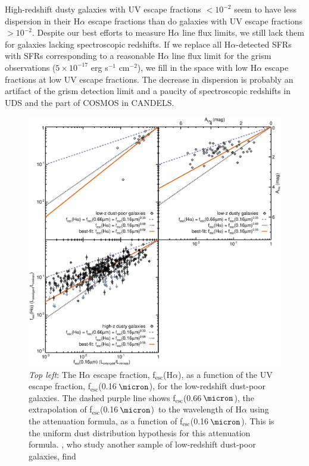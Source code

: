 \documentclass[preprint]{aastex}
\newcommand{\alephuv}{f$_{\mathrm{esc}}$(0.16$\,\micron$)}
\newcommand{\alephha}{f$_{\mathrm{esc}}$(H$\alpha$)}
\newcommand{\alephuvha}{f$_{\mathrm{esc}}$(0.66$\,\micron$)}
\begin{document}
High-redshift dusty galaxies with UV escape fractions $< 10^{-2}$ seem to have
less dispersion in their H$\alpha$ escape fractions than do galaxies with UV
escape fractions $> 10^{-2}$.  Despite our best efforts to measure H$\alpha$
line flux limits, we still lack them for galaxies lacking spectroscopic
redshifts.  If we replace all H$\alpha$-detected SFRs with SFRs corresponding
to a reasonable H$\alpha$ line flux limit for the grism observations
($5 \times 10^{-17}$ erg s$^{-1}$ cm$^{-2}$), we fill in the space with low
H$\alpha$ escape fractions at low UV escape fractions.  The decrease in
dispersion is probably an artifact of the grism detection limit and a paucity
of spectroscopic redshifts in UDS and the part of COSMOS in CANDELS.

\begin{figure}[!ht]
\centering
\includegraphics[scale=0.365]{fha_fuv.eps}
\caption{{\small \emph{Top left}: The H$\alpha$ escape fraction, \alephha, as a
function of the UV
escape fraction, \alephuv, for the low-redshift
dust-poor galaxies.  The dashed purple line shows \alephuvha, the extrapolation
of \alephuv~to the wavelength of H$\alpha$ using the \citet{calzetti00}
attenuation formula, as a function of \alephuv.  This is the uniform dust
distribution hypothesis for this attenuation formula.  \citet{calzetti97b}, who
study another sample of low-redshift dust-poor galaxies, find
}}
\end{figure}
\end{document}
